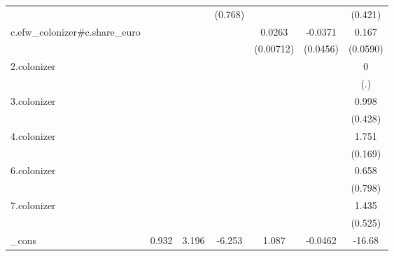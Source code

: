 {\begin{tabular}{l*{6}{c}}
            &                     &                     &     (0.768)         &                     &                     &     (0.421)         \\
[1em]
c.efw\_colonizer#c.share\_euro&                     &                     &                     &      0.0263\sym{***}&     -0.0371         &       0.167\sym{**} \\
            &                     &                     &                     &   (0.00712)         &    (0.0456)         &    (0.0590)         \\
[1em]
2.colonizer &                     &                     &                     &                     &                     &           0         \\
            &                     &                     &                     &                     &                     &         (.)         \\
[1em]
3.colonizer &                     &                     &                     &                     &                     &       0.998\sym{*}  \\
            &                     &                     &                     &                     &                     &     (0.428)         \\
[1em]
4.colonizer &                     &                     &                     &                     &                     &       1.751\sym{***}\\
            &                     &                     &                     &                     &                     &     (0.169)         \\
[1em]
6.colonizer &                     &                     &                     &                     &                     &       0.658         \\
            &                     &                     &                     &                     &                     &     (0.798)         \\
[1em]
7.colonizer &                     &                     &                     &                     &                     &       1.435\sym{*}  \\
            &                     &                     &                     &                     &                     &     (0.525)         \\
[1em]
\_cons      &       0.932         &       3.196\sym{*}  &      -6.253         &       1.087         &     -0.0462         &      -16.68\sym{***}\\

\end{tabular}}
